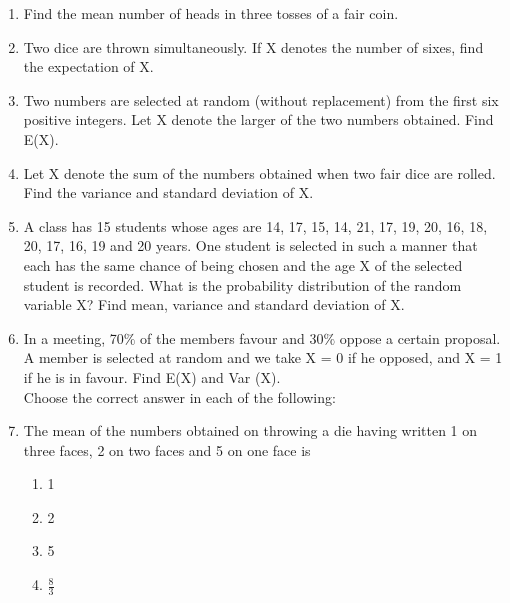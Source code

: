 \begin{enumerate}[label=\arabic*.,ref=\thesubsection.\theenumi]
\item Find the mean number of heads in three tosses of a fair coin.\\

\item Two dice are thrown simultaneously. If X denotes the number of sixes, find the
expectation of X.\\

\item Two numbers are selected at random (without replacement) from the first six positive integers. Let X denote the larger of the two numbers obtained. Find E(X).\\

\item Let X denote the sum of the numbers obtained when two fair dice are rolled. Find the variance and standard deviation of X.\\

\item A class has 15 students whose ages are 14, 17, 15, 14, 21, 17, 19, 20, 16, 18, 20,
17, 16, 19 and 20 years. One student is selected in such a manner that each has the same chance of being chosen and the age X of the selected student is recorded. What is the probability distribution of the random variable X? Find mean, variance and standard deviation of X.\\

\item In a meeting, 70$\%$ of the members favour and 30$\%$ oppose a certain proposal.
A member is selected at random and we take X = 0 if he opposed, and X = 1 if he is in favour. Find E(X) and Var (X).\\

Choose the correct answer in each of the following:\\
\item The mean of the numbers obtained on throwing a die having written 1 on three faces, 2 on two faces and 5 on one face is\\
\begin{enumerate}
\item 1
\item 2
\item 5
\item $\frac{8}{3}$
\end{enumerate}


\end{enumerate}
